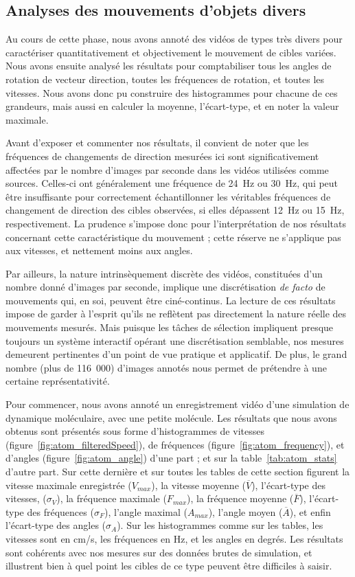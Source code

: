 	\FloatBarrier \subsection{Analyses des mouvements d'objets divers}
	Au cours de cette phase, nous avons annoté des vidéos de types très divers pour caractériser quantitativement et objectivement le mouvement de cibles variées. Nous avons ensuite analysé les résultats pour comptabiliser tous les angles de rotation de vecteur direction, toutes les fréquences de rotation, et toutes les vitesses. Nous avons donc pu construire des histogrammes pour chacune de ces grandeurs, mais aussi en calculer la moyenne, l'écart-type, et en noter la valeur maximale.
	
	Avant d'exposer et commenter nos résultats, il convient de noter que les fréquences de changements de direction mesurées ici sont significativement affectées par le nombre d'images par seconde dans les vidéos utilisées comme sources. Celles-ci ont généralement une fréquence de 24~Hz ou 30~Hz, qui peut être insuffisante pour correctement échantillonner les véritables fréquences de changement de direction des cibles observées, si elles dépassent 12~Hz ou 15~Hz, respectivement. La prudence s'impose donc pour l'interprétation de nos résultats concernant cette caractéristique du mouvement ; cette réserve ne s'applique pas aux vitesses, et nettement moins aux angles.
	
	Par ailleurs, la nature intrinsèquement discrète des vidéos, constituées d'un nombre donné d'images par seconde, implique une discrétisation \emph{de facto} de mouvements qui, en soi, peuvent être ciné-continus. La lecture de ces résultats impose de garder à l'esprit qu'ils ne reflètent pas directement la nature réelle des mouvements mesurés. Mais puisque les tâches de sélection impliquent presque toujours un système interactif opérant une discrétisation semblable, nos mesures demeurent pertinentes d'un point de vue pratique et applicatif. De plus, le grand nombre (plus de 116~000) d'images annotés nous permet de prétendre à une certaine représentativité.
	
	Pour commencer, nous avons annoté un enregistrement vidéo d'une simulation de dynamique moléculaire, avec une petite molécule. Les résultats que nous avons obtenus sont présentés sous forme d'histogrammes de vitesses (figure~\ref{fig:atom_filteredSpeed}), de fréquences (figure~\ref{fig:atom_frequency}), et d'angles (figure~\ref{fig:atom_angle}) d'une part ; et sur la table~\ref{tab:atom_stats} d'autre part. Sur cette dernière et sur toutes les tables de cette section figurent la vitesse maximale enregistrée ($V_{max}$), la vitesse moyenne ($\overline{V}$), l'écart-type des vitesses, ($\sigma_{V}$), la fréquence maximale ($F_{max}$), la fréquence moyenne ($\overline{F}$), l'écart-type des fréquences ($\sigma_{F}$), l'angle maximal ($A_{max}$), l'angle moyen ($\overline{A}$), et enfin l'écart-type des angles ($\sigma_{A}$). Sur les histogrammes comme sur les tables, les vitesses sont en cm/s, les fréquences en Hz, et les angles en degrés. Les résultats sont cohérents avec nos mesures sur des données brutes de simulation, et illustrent bien à quel point les cibles de ce type peuvent être difficiles à saisir.
	
